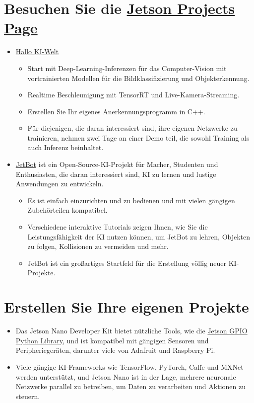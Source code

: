 \section{Besuchen Sie die \href{https://developer.nvidia.com/embedded/community/jetson-projects}{Jetson Projects Page}}

\begin{itemize}
    \item \href{https://developer.nvidia.com/embedded/twodaystoademo#hello_ai_world}{Hallo KI-Welt}
    \begin{itemize}
        \item Start mit Deep-Learning-Inferenzen für das Computer-Vision mit vortrainierten Modellen für die Bildklassifizierung und Objekterkennung.
        \item Realtime Beschleunigung mit TensorRT und Live-Kamera-Streaming.
        \item Erstellen Sie Ihr eigenes Anerkennungsprogramm in C++.
        \item Für diejenigen, die daran interessiert sind, ihre eigenen Netzwerke zu trainieren, nehmen zwei Tage an einer Demo teil, die sowohl Training als auch Inferenz beinhaltet.
    \end{itemize}
    
    \item \href{https://github.com/NVIDIA-AI-IOT/jetbot}{JetBot} ist ein Open-Source-KI-Projekt für Macher, Studenten und Enthusiasten, die daran interessiert sind, KI zu lernen und lustige Anwendungen zu entwickeln. 
    \begin{itemize}
        \item Es ist einfach einzurichten und zu bedienen und mit vielen gängigen Zubehörteilen kompatibel.
        \item Verschiedene interaktive Tutorials zeigen Ihnen, wie Sie die Leistungsfähigkeit der KI nutzen können, um JetBot zu lehren, Objekten zu folgen, Kollisionen zu vermeiden und mehr.
        \item JetBot ist ein großartiges Startfeld für die Erstellung völlig neuer KI-Projekte.
    \end{itemize}
\end{itemize}


\section{Erstellen Sie Ihre eigenen Projekte}

\begin{itemize}
    \item Das Jetson Nano Developer Kit bietet nützliche Tools, wie die \href{https://github.com/NVIDIA/jetson-gpio}{Jetson GPIO Python Library}, und ist kompatibel mit gängigen Sensoren und Peripheriegeräten, darunter viele von Adafruit und Raspberry Pi.
    \item Viele gängige KI-Frameworks wie TensorFlow, PyTorch, Caffe und MXNet werden unterstützt, und Jetson Nano ist in der Lage, mehrere neuronale Netzwerke parallel zu betreiben, um Daten zu verarbeiten und Aktionen zu steuern.
\end{itemize}


